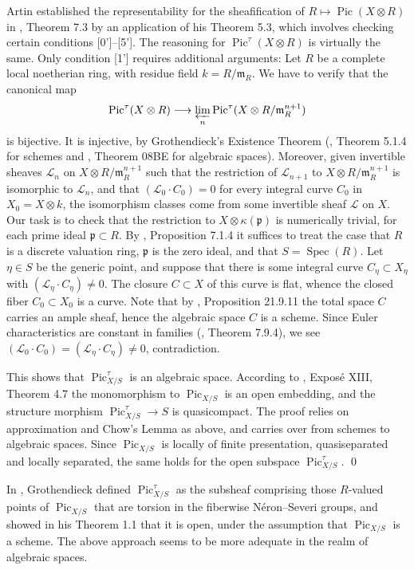\documentclass[oneside, 12pt]{amsart}
\theoremstyle{definition}
\theoremstyle{remark}
\newcommand{\shL}{\mathscr{L}}
\newcommand{\invlim}{\varprojlim}
\newcommand{\lra}{\longrightarrow}
\newcommand{\maxid}{\mathfrak{m}}
\newcommand{\primid}{\mathfrak{p}}
\newcommand{\Pic}{\operatorname{Pic}}
\newcommand{\ra}{\rightarrow}
\newcommand{\Spec}{\operatorname{Spec}}
\begin{document}
Artin established the representability for the sheafification of  $R\mapsto\Pic(X\otimes R)$ in \cite{Artin 1969}, Theorem 7.3  by an application of his  
Theorem 5.3, which involves checking certain conditions [0']--[5']. 
The reasoning for $\Pic^\tau(X\otimes R)$ is virtually the same. Only    condition [1'] requires   additional arguments:
Let $R$ be a complete local noetherian ring, with residue field $k=R/\maxid_R$.
We have to verify that the canonical map 
$$
\Pic^\tau(X\otimes R)\lra \invlim_n\Pic^\tau(X\otimes R/\maxid_R^{n+1})
$$
is bijective. It is injective, by Grothendieck's Existence Theorem 
(\cite{EGA IIIa}, Theorem 5.1.4 for schemes and \cite{SP}, 
Theorem 08BE for algebraic spaces).
Moreover, given invertible sheaves  $\shL_n$ on $X\otimes R/\maxid_R^{n+1}$ such
that the restriction of $\shL_{n+1}$ to $X\otimes R/\maxid_R^{n+1}$ is isomorphic to $\shL_n$,
and  that $(\shL_0\cdot C_0)=0$
for every integral curve $C_0$ in $X_0=X\otimes k$, the isomorphism classes come from some  invertible sheaf $\shL$ on $X$.
Our task is to check that the restriction to $X\otimes\kappa(\primid)$  is numerically trivial, for each prime ideal $\primid\subset R$.
By \cite{EGA II}, Proposition 7.1.4 it suffices to treat the case that $R$ is a discrete valuation ring,   $\primid$ is the zero ideal,
and that $S=\Spec(R)$. Let $\eta\in S$ be the generic point, and suppose that there is some integral curve $C_\eta\subset X_\eta$
with $(\shL_\eta\cdot C_\eta)\neq 0$.
The closure $C\subset X$ of this curve is flat, whence  the closed fiber 
$C_0\subset X_0$ is a curve. Note that by  \cite{EGA IVd}, Proposition 21.9.11 the total space $C$ carries an ample sheaf, 
hence the algebraic space $C$ is  a scheme. Since Euler characteristics are constant in families (\cite{EGA IIIb}, Theorem 7.9.4), we see 
 $(\shL_0\cdot C_0)=(\shL_\eta\cdot C_\eta)\neq 0$, contradiction.

This shows that $\Pic^\tau_{X/S}$ is an algebraic space.
According to \cite{SGA 6}, Expos\'e XIII, Theorem 4.7 the monomorphism to $\Pic_{X/S}$ is an open embedding,
and the structure morphism $\Pic^\tau_{X/S}\ra S$ is quasicompact. The proof relies on   approximation and Chow's Lemma as above,
and carries over from schemes to algebraic spaces. Since $\Pic_{X/S}$ is   locally of finite presentation, quasiseparated and locally separated,
the same holds for the open subspace $\Pic^\tau_{X/S}$.
\qed

\medskip
In \cite{FGA VI}, Grothendieck defined   $\Pic^\tau_{X/S}$ as the   subsheaf comprising those $R$-valued points
of $\Pic_{X/S}$ that are torsion in the fiberwise N\'eron--Severi groups, and showed in his Theorem 1.1
that it is open, under the assumption that $\Pic_{X/S}$ is a scheme.
The above approach seems to be more adequate in the realm of  algebraic spaces.
\end{document}
